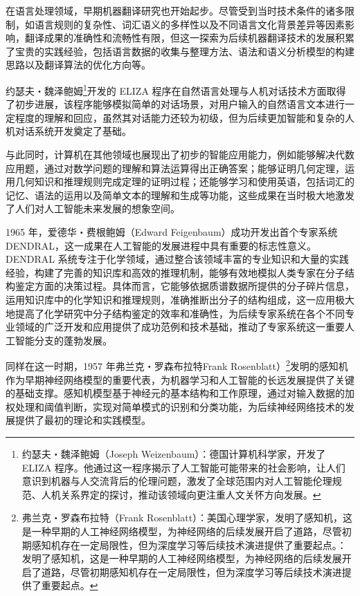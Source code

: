 在语言处理领域，早期机器翻译研究也开始起步。尽管受到当时技术条件的诸多限制，如语言规则的复杂性、词汇语义的多样性以及不同语言文化背景差异等因素影响，翻译成果的准确性和流畅性有限，但这一探索为后续机器翻译技术的发展积累了宝贵的实践经验，包括语言数据的收集与整理方法、语法和语义分析模型的构建思路以及翻译算法的优化方向等。


约瑟夫・魏泽鲍姆\footnote{约瑟夫・魏泽鲍姆（Joseph Weizenbaum）：德国计算机科学家，开发了 ELIZA 程序。他通过这一程序揭示了人工智能可能带来的社会影响，让人们意识到机器与人交流背后的伦理问题，激发了全球范围内对人工智能伦理规范、人机关系界定的探讨，推动该领域向更注重人文关怀方向发展。}开发的 ELIZA 程序在自然语言处理与人机对话技术方面取得了初步进展，该程序能够模拟简单的对话场景，对用户输入的自然语言文本进行一定程度的理解和回应，虽然其对话能力还较为初级，但为后续更加智能和复杂的人机对话系统开发奠定了基础。


与此同时，计算机在其他领域也展现出了初步的智能应用能力，例如能够解决代数应用题，通过对数学问题的理解和算法运算得出正确答案；能够证明几何定理，运用几何知识和推理规则完成定理的证明过程；还能够学习和使用英语，包括词汇的记忆、语法的运用以及简单文本的理解和生成等功能，这些成果在当时极大地激发了人们对人工智能未来发展的想象空间。


1965 年，爱德华・费根鲍姆（Edward Feigenbaum）成功开发出首个专家系统 DENDRAL，这一成果在人工智能的发展进程中具有重要的标志性意义。DENDRAL 系统专注于化学领域，通过整合该领域丰富的专业知识和大量的实践经验，构建了完善的知识库和高效的推理机制，能够有效地模拟人类专家在分子结构鉴定方面的决策过程。具体而言，它能够依据质谱数据所提供的分子碎片信息，运用知识库中的化学知识和推理规则，准确推断出分子的结构组成，这一应用极大地提高了化学研究中分子结构鉴定的效率和准确性，为后续专家系统在各个不同专业领域的广泛开发和应用提供了成功范例和技术基础，推动了专家系统这一重要人工智能分支的蓬勃发展。


同样在这一时期，1957 年弗兰克・罗森布拉特Frank Rosenblatt）\footnote{弗兰克・罗森布拉特（Frank Rosenblatt）：美国心理学家，发明了感知机，这是一种早期的人工神经网络模型，为神经网络的后续发展开启了道路，尽管初期感知机存在一定局限性，但为深度学习等后续技术演进提供了重要起点。：发明了感知机，这是一种早期的人工神经网络模型，为神经网络的后续发展开启了道路，尽管初期感知机存在一定局限性，但为深度学习等后续技术演进提供了重要起点。}发明的感知机作为早期神经网络模型的重要代表，为机器学习和人工智能的长远发展提供了关键的基础支撑。感知机模型基于神经元的基本结构和工作原理，通过对输入数据的加权处理和阈值判断，实现对简单模式的识别和分类功能，为后续神经网络技术的发展提供了最初的理论和实践模型。


